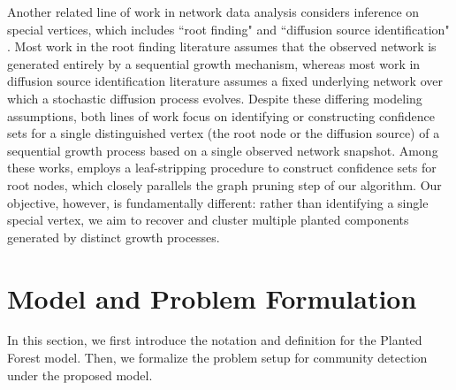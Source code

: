 \documentclass[twoside,11pt]{article}
\theoremstyle{remark}
\begin{document}
Another related line of work in network data analysis considers inference on special vertices, which includes ``root finding" \citep{bubeck2017finding, banerjee2022root,banerjee2023degree,crane2021inference,crane2024root,addario2025leaf} and ``diffusion source identification" \citep{dawkins2021diffusion,li2021propagation,dong2022wavefront,shah2011rumors}.
Most work in the root finding literature assumes that the observed network is generated entirely by a sequential growth mechanism, whereas most work in diffusion source identification literature assumes a fixed underlying network over which a stochastic diffusion process evolves.
Despite these differing modeling assumptions, both lines of work focus on identifying or constructing confidence sets for a single distinguished vertex (the root node or the diffusion source) of a sequential growth process based on a single observed network snapshot.
Among these works, \cite{addario2025leaf} employs a leaf-stripping procedure to construct confidence sets for root nodes, which closely parallels the graph pruning step of our algorithm. 
Our objective, however, is fundamentally different: rather than identifying a single special vertex, we aim to recover and cluster multiple planted components generated by distinct growth processes.


\section{Model and Problem Formulation}
\label{sec: model}
In this section, we first introduce the notation and definition for the Planted Forest model.
Then, we formalize the problem setup for community detection under the proposed model.
\end{document}
